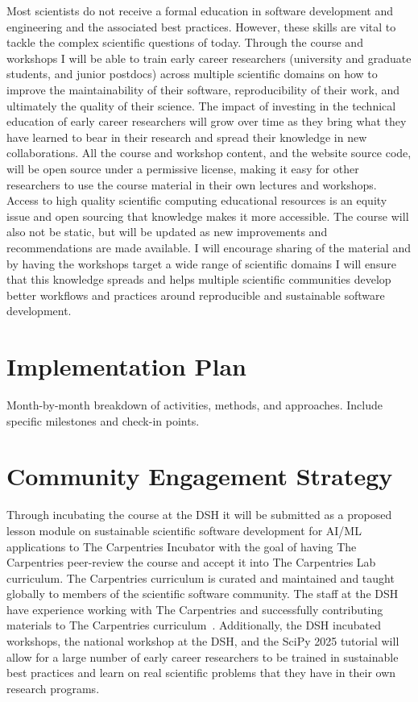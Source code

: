 \documentclass[letterpaper, 11pt]{article}
\begin{document}
Most scientists do not receive a formal education in software development and engineering and the associated best practices.
However, these skills are vital to tackle the complex scientific questions of today.
Through the course and workshops I will be able to train early career researchers (university and graduate students, and junior postdocs) across multiple scientific domains on how to improve the maintainability of their software, reproducibility of their work, and ultimately the quality of their science.
The impact of investing in the technical education of early career researchers will grow over time as they bring what they have learned to bear in their research and spread their knowledge in new collaborations.
All the course and workshop content, and the website source code, will be open source under a permissive license, making it easy for other researchers to use the course material in their own lectures and workshops.
Access to high quality scientific computing educational resources is an equity issue and open sourcing that knowledge makes it more accessible. The course will also not be static, but will be updated as new improvements and recommendations are made available.
I will encourage sharing of the material and by having the workshops target a wide range of scientific domains I will ensure that this knowledge spreads and helps multiple scientific communities develop better workflows and practices around reproducible and sustainable software development.

\section{Implementation Plan}

Month-by-month breakdown of activities, methods, and approaches.
Include specific milestones and check-in points.

\section{Community Engagement Strategy}


Through incubating the course at the DSH it will be submitted as a proposed lesson module on sustainable scientific software development for AI/ML applications to The Carpentries Incubator with the goal of having The Carpentries peer-review the course and accept it into The Carpentries Lab curriculum.
The Carpentries curriculum is curated and maintained and taught globally to members of the scientific software community.
The staff at the DSH have experience working with The Carpentries and successfully contributing materials to The Carpentries curriculum~\cite{backhaus_2024_14360351}.
Additionally, the DSH incubated workshops, the national workshop at the DSH, and the SciPy 2025 tutorial will allow for a large number of early career researchers to be trained in sustainable best practices and learn on real scientific problems that they have in their own research programs.
\end{document}
